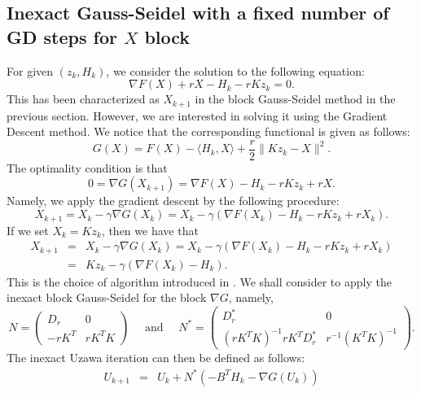 \begin{itemize}
\subsection{Inexact Gauss-Seidel with a fixed number of GD steps for $X$ block} 
For given $(z_k, H_k)$, we consider the solution to the following equation: 
\begin{equation}
\nabla F(X) + r X - H_k - r Kz_k = 0. 
\end{equation}
This has been characterized as $X_{k+1}$ in the block Gauss-Seidel method in the previous section. However, we are interested in solving it using the Gradient Descent method. We notice that the corresponding functional is given as follows: 
\begin{equation} 
G(X) = F(X) - \langle H_k, X \rangle + \frac{r}{2} \|Kz_k - X\|^2. 
\end{equation} 
The optimality condition is that 
\begin{equation} 
0 = \nabla G(X_{k+1}) = \nabla F(X) - H_k -r Kz_k + rX. 
\end{equation}
Namely, we apply the gradient descent by the following procedure: 
\begin{equation} 
X_{k+1} = X_k - \gamma \nabla G(X_k) = X_k - \gamma (\nabla F(X_k) - H_k - rKz_k + rX_k). 
\end{equation} 
If we set $X_k = Kz_k$, then we have that
\begin{eqnarray*} 
X_{k+1} &=& X_k - \gamma \nabla G(X_k) = X_k - \gamma (\nabla F(X_k) - H_k - rKz_k + rX_k) \\
&=& Kz_k - \gamma(\nabla F(X_k) - H_k).   
\end{eqnarray*}
This is the choice of algorithm introduced in \cite{mishchenko2022proxskip}.  
We shall consider to apply the inexact block Gauss-Seidel for the block $\nabla G$, namely, 
\begin{equation}
N = \begin{pmatrix}
D_r & 0\\
-r K^T & rK^T K 
\end{pmatrix} 
\quad \mbox{ and } \quad N^{*} = \begin{pmatrix}
D_r^{*} & 0\\
(r K^T K)^{-1} r K^T D_r^{*} & r^{-1} (K^T K)^{-1} 
\end{pmatrix}.  
\end{equation}
The inexact Uzawa iteration can then be defined as follows: 
\begin{eqnarray}
U_{k+1} &=& U_k + N^{*} (-B^T H_k - \nabla G(U_k)) \\

\end{eqnarray}
\end{itemize}
